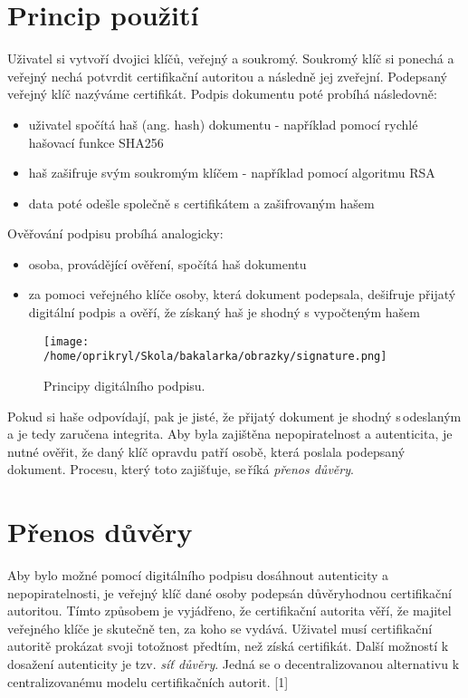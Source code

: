\documentclass[]{fithesis3}
\begin{document}
\section{Princip použití}
Uživatel si vytvoří dvojici klíčů, veřejný a soukromý. Soukromý klíč si ponechá a veřejný nechá potvrdit certifikační autoritou a následně jej zveřejní. Podepsaný veřejný klíč nazýváme certifikát. Podpis dokumentu poté probíhá následovně:
\begin{itemize}
\item uživatel spočítá haš (ang. hash) dokumentu - například pomocí rychlé hašovací funkce SHA256
\item haš zašifruje svým soukromým klíčem - například pomocí algoritmu RSA
\item data poté odešle společně s certifikátem a zašifrovaným hašem
\end{itemize}
Ověřování podpisu probíhá analogicky:
\begin{itemize}
\item osoba, provádějící ověření, spočítá haš dokumentu
\item za pomoci veřejného klíče osoby, která dokument podepsala, dešifruje přijatý digitální podpis a ověří, že získaný haš je shodný s vypočteným hašem
\end{itemize}
\begin{figure}[!ht]
  	\begin{minipage}{1.00\textwidth}
    		\texttt{[image: /home/oprikryl/Skola/bakalarka/obrazky/signature.png]}
  	\end{minipage}
 	\caption{Principy digitálního podpisu.}
  	\label{fig:Digitální podpis.}
\end{figure}
Pokud si haše odpovídají, pak je jisté, že přijatý dokument je shodný s\,odeslaným a je tedy zaručena integrita. Aby byla zajištěna nepopiratelnost a autenticita, je nutné ověřit, že daný klíč opravdu patří osobě, která poslala podepsaný dokument. Procesu, který toto zajišťuje, se\,říká \textit{přenos důvěry}. 

\section{Přenos důvěry}
Aby bylo možné pomocí digitálního podpisu dosáhnout autenticity a\,nepopiratelnosti, je veřejný klíč dané osoby podepsán důvěryhodnou certifikační autoritou. Tímto způsobem je vyjádřeno, že certifikační autorita věří, že majitel veřejného klíče je skutečně ten, za koho se vydává. Uživatel musí certifikační autoritě prokázat svoji totožnost předtím, než získá certifikát.
Další možností k dosažení autenticity je tzv. \textit{síť důvěry}. Jedná se o decentralizovanou alternativu k centralizovanému modelu certifikačních autorit. [1]
\end{document}

